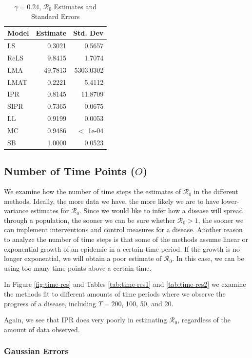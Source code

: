 \documentclass[12pt]{article}
\newcommand{\rr}{\ensuremath{\mathcal{R}_0}}
\begin{document}
\begin{table}[H]
	
	\centering
	\begin{tabular}[t]{l|r|r}
		\hline
		Model & Estimate & Std. Dev\\
		\hline
		LS & 0.3021 & 0.5657\\
		\hline
		ReLS & 9.8415 & 1.7074\\
		\hline
		LMA & -49.7813 & 5303.0302\\
		\hline
		LMAT & 0.2221 & 5.4112\\
		\hline
		IPR & 0.8145 & 11.8709\\
		\hline
		SIPR & 0.7365 & 0.0675\\
		\hline
		LL & 0.9199 & 0.0053\\
		\hline
		MC & 0.9486 & $<$ 1e-04\\
		\hline
		SB & 1.0000 & 0.0523\\
		\hline
	\end{tabular}
	\caption{$\gamma = 0.24$, $\rr$ Estimates and Standard Errors}
\end{table}

\subsection{Number of Time Points ($O$)}\label{sec:res-time}
We examine how the number of time steps the estimates of $\rr$ in the different methods.  Ideally, the more data we have, the more likely we are to have lower-variance estimates for $\rr$.  Since we would like to  infer how a disease will spread through a population, the sooner we can be sure whether $\rr> 1$, the sooner we can implement interventions and control measures for a disease.  Another reason to analyze the number of time steps is that some of the methods assume linear or exponential growth of an epidemic in a certain time period.  If the growth is no longer exponential, we will obtain a poor estimate of $\rr$.  In this case, we can be using too many time points above a certain time.

In Figure \ref{fig:time-res} and Tables \ref{tab:time-res1} and \ref{tab:time-res2} we examine the methods fit to different amounts of time periods where we observe the progress of a disease, including $T=200$, 100, 50, and 20.

Again, we see that IPR does very poorly in estimating $\rr$, regardless of the amount of data observed.

\subsubsection{Gaussian Errors}
\end{document}
